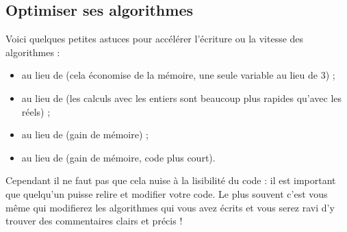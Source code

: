 \documentclass[class=report,crop=false]{standalone}
\begin{document}
\subsection{Optimiser ses algorithmes}

Voici quelques petites astuces pour accélérer l'écriture ou la vitesse des algorithmes :
\begin{itemize}
  \item {} au lieu de  (cela économise de la mémoire, une seule variable au lieu de $3$) ;
  \item {} au lieu de  (les calculs avec les entiers sont beaucoup plus rapides qu'avec les réels) ;
  \item {} au lieu de  (gain de mémoire) ;
  \item {} au lieu de  (gain de mémoire, code plus court).
\end{itemize}

Cependant il ne faut pas que cela nuise à la lisibilité du code : il est important que quelqu'un
puisse relire et modifier votre code. Le plus souvent c'est vous même qui modifierez les algorithmes qui vous avez écrits
et vous serez ravi d'y trouver des commentaires clairs et précis !



\end{document}

